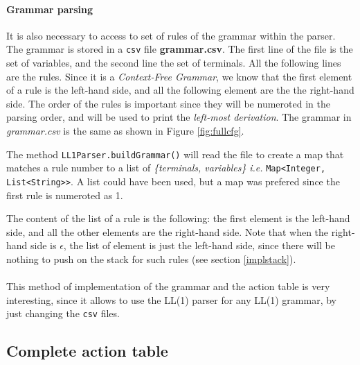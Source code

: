 \documentclass[letterpaper]{article}
\begin{document}
\paragraph{Grammar parsing}
It is also necessary to access to set of rules of the grammar within the
parser. The grammar is stored in a \texttt{csv} file \textbf{grammar.csv}.
The first line of the file is the set of variables, and the second line
the set of terminals. All the following lines are the rules.
Since it is a \textit{Context-Free Grammar}, we know that the first element
of a rule is the left-hand side, and all the following element are the
the right-hand side.
The order of the rules is important since they will be numeroted in the parsing
order, and will be used to print the \textit{left-most derivation}.
The grammar in \textit{grammar.csv} is the same as shown in
Figure \ref{fig:fullcfg}.

The method \texttt{LL1Parser.buildGrammar()} will read the file to create
a map that matches a rule number to a list
of \textit{\{terminals, variables\}}
\textit{i.e.} \texttt{Map<Integer, List<String>>}.
A list could have been used, but a map was prefered since the first rule
is numeroted as 1.


The content of the list
of a rule is the following: the first element is the left-hand side, and
all the other elements are the right-hand side.
Note that when the right-hand side is $\epsilon$, the list of element
is just the left-hand side,
since there will be nothing to push on the stack for such
rules (see section \ref{implstack}).

\paragraph{}

This method of implementation of the grammar and the action table is very
interesting, since it allows to use the LL(1) parser for any LL(1) grammar,
by just changing the \texttt{csv} files.

\subsection{Complete action table}

\paragraph{}
\end{document}
